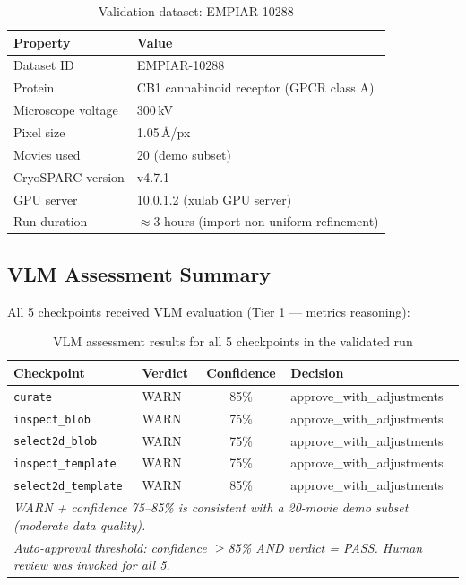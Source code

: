 \documentclass[12pt, a4paper]{article}
\begin{document}
\begin{table}[H]
\centering
\caption{Validation dataset: EMPIAR-10288}
\label{tab:dataset}
\renewcommand{\arraystretch}{1.3}
\begin{tabular}{l l}
\toprule
\textbf{Property} & \textbf{Value} \\
\midrule
Dataset ID         & EMPIAR-10288 \\
Protein            & CB1 cannabinoid receptor (GPCR class A) \\
Microscope voltage & 300\,kV \\
Pixel size         & 1.05\,\AA/px \\
Movies used        & 20 (demo subset) \\
CryoSPARC version  & v4.7.1 \\
GPU server         & 10.0.1.2 (xulab GPU server) \\
Run duration       & $\approx$3 hours (import \textrightarrow{} non-uniform refinement) \\
\bottomrule
\end{tabular}
\end{table}

\subsection{VLM Assessment Summary}

All 5 checkpoints received VLM evaluation (Tier 1 --- metrics reasoning):

\begin{table}[H]
\centering
\caption{VLM assessment results for all 5 checkpoints in the validated run}
\label{tab:vlm-results}
\renewcommand{\arraystretch}{1.3}
\begin{tabular}{l l c l}
\toprule
\textbf{Checkpoint} & \textbf{Verdict} & \textbf{Confidence}
  & \textbf{Decision} \\
\midrule
\texttt{curate}             & WARN & 85\%
  & approve\_with\_adjustments \\
\texttt{inspect\_blob}      & WARN & 75\%
  & approve\_with\_adjustments \\
\texttt{select2d\_blob}     & WARN & 75\%
  & approve\_with\_adjustments \\
\texttt{inspect\_template}  & WARN & 75\%
  & approve\_with\_adjustments \\
\texttt{select2d\_template} & WARN & 85\%
  & approve\_with\_adjustments \\
\bottomrule
\multicolumn{4}{l}{\small\itshape WARN + confidence 75--85\% is consistent with
a 20-movie demo subset (moderate data quality).}\\
\multicolumn{4}{l}{\small\itshape Auto-approval threshold: confidence $\geq$85\%
AND verdict = PASS. Human review was invoked for all 5.}
\end{tabular}
\end{table}
\end{document}
